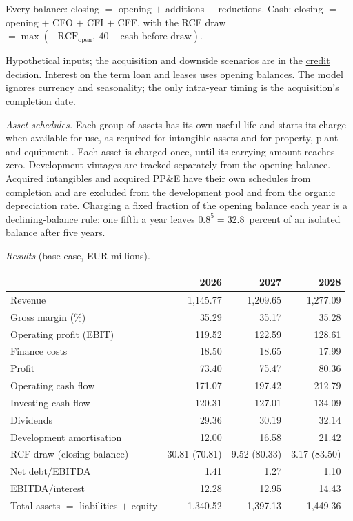 \begin{qfexample}
 Every balance: closing $=$ opening $+$ additions $-$ reductions. Cash: closing $=$ opening $+$ CFO $+$ CFI $+$ CFF, with the RCF draw $=\max(-\text{RCF}_{\text{open}},\ 40-\text{cash before draw})$.

 Hypothetical inputs; the acquisition and downside scenarios are in the \hyperref[ex:integrated-credit-decision]{credit decision}. Interest on the term loan and leases uses opening balances. The model ignores currency and seasonality; the only intra-year timing is the acquisition's completion date.

\emph{Asset schedules.} Each group of assets has its own useful life and starts its charge when available for use, as required for intangible assets \citep[IAS~38 para.~97]{eu-2023-1803-ias38} and for property, plant and equipment \citep[IAS~16 para.~55]{eu-2023-1803-ias16}. Each asset is charged once, until its carrying amount reaches zero. Development vintages are tracked separately from the opening balance. Acquired intangibles and acquired PP\&E have their own schedules from completion and are excluded from the development pool and from the organic depreciation rate. Charging a fixed fraction of the opening balance each year is a declining-balance rule: one fifth a year leaves $0.8^5=32.8$~percent of an isolated balance after five years.

 \emph{Results} (base case, EUR millions).

\begin{center}\small
\begin{tabular}{@{}lrrr@{}}
\toprule
 & 2026 & 2027 & 2028\\
\midrule
Revenue & 1{,}145.77 & 1{,}209.65 & 1{,}277.09\\
Gross margin (\%) & 35.29 & 35.17 & 35.28\\
Operating profit (EBIT) & 119.52 & 122.59 & 128.61\\
Finance costs & 18.50 & 18.65 & 17.99\\
Profit & 73.40 & 75.47 & 80.36\\
Operating cash flow & 171.07 & 197.42 & 212.79\\
Investing cash flow & $-120.31$ & $-127.01$ & $-134.09$\\
Dividends & 29.36 & 30.19 & 32.14\\
Development amortisation & 12.00 & 16.58 & 21.42\\
RCF draw (closing balance) & 30.81 (70.81) & 9.52 (80.33) & 3.17 (83.50)\\
Net debt$/$EBITDA & 1.41 & 1.27 & 1.10\\
EBITDA$/$interest & 12.28 & 12.95 & 14.43\\
Total assets $=$ liabilities $+$ equity & 1{,}340.52 & 1{,}397.13 & 1{,}449.36\\
\bottomrule
\end{tabular}
\end{center}


\end{qfexample}
